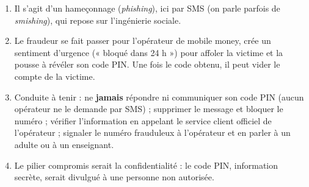 \documentclass[11pt]{article}
\newcommand{\cle}[1]{{\popxbold\color{popdark}#1}}
\begin{document}
\begin{corrige}
\begin{enumerate}
\item Il s'agit d'un \cle{hameçonnage} (\emph{phishing}), ici par SMS (on parle parfois de \emph{smishing}), qui repose sur l'\cle{ingénierie sociale}.
\item Le fraudeur se fait passer pour l'opérateur de mobile money, crée un sentiment d'urgence (« bloqué dans 24 h ») pour affoler la victime et la pousse à révéler son code PIN. Une fois le code obtenu, il peut vider le compte de la victime.
\item Conduite à tenir : ne \textbf{jamais} répondre ni communiquer son code PIN (aucun opérateur ne le demande par SMS) ; supprimer le message et bloquer le numéro ; vérifier l'information en appelant le service client officiel de l'opérateur ; signaler le numéro frauduleux à l'opérateur et en parler à un adulte ou à un enseignant.
\item Le pilier compromis serait la \cle{confidentialité} : le code PIN, information secrète, serait divulgué à une personne non autorisée.
\end{enumerate}
\end{corrige}
\end{document}
